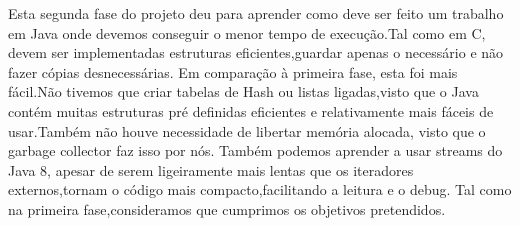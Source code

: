 \documentclass[letterpaper, 10 pt, conference]{IEEEtran}  %
\begin{document}
Esta segunda fase do projeto deu para aprender como deve ser feito um trabalho em Java onde devemos conseguir o menor tempo de execução.Tal como em C, devem ser implementadas estruturas eficientes,guardar apenas o necessário e não fazer cópias desnecessárias.
\newline
Em comparação à primeira fase, esta foi mais fácil.Não tivemos que criar tabelas de Hash ou listas ligadas,visto que o Java contém muitas estruturas pré definidas eficientes e relativamente mais fáceis de usar.Também não houve necessidade de libertar memória alocada, visto que o garbage collector faz isso por nós.
\newline
Também podemos aprender a usar streams do Java 8, apesar de serem ligeiramente mais lentas que os iteradores externos,tornam o código mais compacto,facilitando a leitura e o debug.
\newline
Tal como na primeira fase,consideramos que cumprimos os objetivos pretendidos.












\addtolength{\textheight}{-12cm}   %







\end{document}
